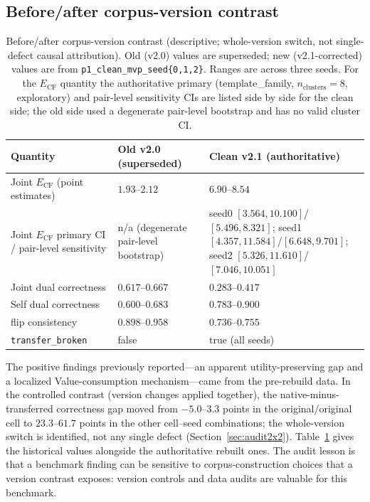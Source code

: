 \documentclass[11pt,twocolumn]{article}
\begin{document}
\subsection{Before/after corpus-version contrast}
\label{sec:reversal}

\begin{table}[t]
\centering
\caption{Before/after corpus-version contrast (descriptive; whole-version
switch, not single-defect causal attribution). Old (v2.0) values are
superseded; new (v2.1-corrected) values are from
\texttt{p1\_clean\_mvp\_seed\{0,1,2\}}. Ranges are across three seeds. For the
$E_{\mathrm{CF}}$ quantity the authoritative primary (template\_family,
$n_{\mathrm{clusters}}=8$, exploratory) and pair-level sensitivity CIs are
listed side by side for the clean side; the old side used a degenerate
pair-level bootstrap and has no valid cluster CI.}
\label{tab:reversal}
\small
\begin{tabular}{lll}
\toprule
Quantity & Old v2.0 (superseded) & Clean v2.1 (authoritative) \\
\midrule
Joint $E_{\mathrm{CF}}$ (point estimates) & $1.93$--$2.12$ & $6.90$--$8.54$ \\
Joint $E_{\mathrm{CF}}$ primary CI / pair-level sensitivity & n/a (degenerate pair-level bootstrap) &
seed0 $[3.564,10.100]$/$[5.496,8.321]$; seed1 $[4.357,11.584]$/$[6.648,9.701]$; seed2 $[5.326,11.610]$/$[7.046,10.051]$ \\
Joint dual correctness & $0.617$--$0.667$ & $0.283$--$0.417$ \\
Self dual correctness & $0.600$--$0.683$ & $0.783$--$0.900$ \\
flip consistency & $0.898$--$0.958$ & $0.736$--$0.755$ \\
\texttt{transfer\_broken} & false & true (all seeds) \\
\bottomrule
\end{tabular}
\end{table}

The positive findings previously reported---an apparent utility-preserving gap
and a localized Value-consumption mechanism---came from the pre-rebuild data.
In the controlled contrast (version changes applied together), the
native-minus-transferred correctness gap moved from $-5.0$--$3.3$ points in the
original/original cell to $23.3$--$61.7$ points in the other cell--seed
combinations; the whole-version switch is identified, not any single defect
(Section~\ref{sec:audit2x2}). Table~\ref{tab:reversal} gives the historical
values alongside the authoritative rebuilt ones. The audit lesson is that a
benchmark finding can be sensitive to corpus-construction choices that a
version contrast exposes: version controls and data audits are valuable for
this benchmark.
\end{document}
